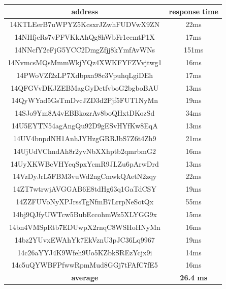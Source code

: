\begin{center}
\begin{tabular}{ |c|c| } 
 \hline
\textbf{address} & \textbf{response time} \\\hline
14KTLEerB7uWPYZ5KcsxrJZwhFUDVwX9ZN & 22ms \\ 
14NHfjeRs7vPFVKkAhQg8hWbFr1cemtP1X & 17ms \\ 
14NNcfY2eFjG5YCC2DmgZfjj8kYmfAvWNs & 151ms \\ 
14NvmcsMQsMmmWkjYQz4XWKFYFZVvjtwg1 & 16ms \\ 
14PWoVZf2zLP7Xdbpxa98c3VpuhqLgiDEh & 17ms \\ 
14QFGVvDKJZEBMagGyDctfvboG2bgboBAU & 13ms \\ 
14QyWYad5GsTmDvcJZD3d2Pjf5FUT1NyMn & 19ms \\ 
14SJo9Ym8A4vEBBkozrAv8boQHxtDKozSd & 34ms \\ 
14U5EYTN54agAngQu92D9gESvHYfKw8EqA & 13ms \\ 
14UV4bnpdNH1AnhJYHzgGRRJbS7Z6t4Zh9 & 21ms \\ 
14UjUdVChndAh8r2yvNbXXhptb2qmrbmG2 & 16ms \\ 
14UyXKWBcVHYcqSpxYcmR9JLZu6pArwDrd & 13ms \\ 
14VzDyJrL5FBM3vuWd2ngCmwkQAetN2zqy & 22ms \\
14ZT7wtrwjAVGGAB6E8tdHg63q1GaTdCSY & 19ms \\
14ZZFUVoNyXPJrssTgNfmB7LrrpNeSotQx & 55ms \\
14bj9QJfyUWTcw5BubEccohmWz5XLYGG9x & 15ms \\ 
14bn4VMSpRtb7EDUwpX2rnqC8WSHoHNyMn & 16ms \\
14bz2YUvxEWAhYk7EkVznU3pJC36Lq9967 & 19ms \\
14c26aYYJ4K9Wfeh9Uo5KZbkSREzYcjx9i & 14ms \\
14c5uQYWBFPfwwRpmMud8GGj7tFAfC7fE5 & 16ms \\
\hline \textbf{average} & \textbf{26.4 ms} \\\hline
\end{tabular}
\end{center}

